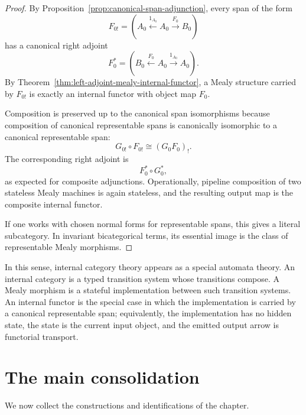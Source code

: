\begin{proof}
By Proposition~\ref{prop:canonical-span-adjunction}, every span of the form
\[
F_{0!}
=
\left(
A_0
\xleftarrow{1_{A_0}}
A_0
\xrightarrow{F_0}
B_0
\right)
\]
has a canonical right adjoint
\[
F_0^\ast
=
\left(
B_0
\xleftarrow{F_0}
A_0
\xrightarrow{1_{A_0}}
A_0
\right).
\]
By Theorem~\ref{thm:left-adjoint-mealy-internal-functor}, a Mealy structure carried by \(F_{0!}\) is exactly an internal functor with object map \(F_0\).

Composition is preserved up to the canonical span isomorphisms because composition of canonical representable spans is canonically isomorphic to a canonical representable span:
\[
G_{0!}\circ F_{0!}\cong (G_0F_0)_!.
\]
The corresponding right adjoint is
\[
F_0^\ast\circ G_0^\ast,
\]
as expected for composite adjunctions. Operationally, pipeline composition of two stateless Mealy machines is again stateless, and the resulting output map is the composite internal functor.

If one works with chosen normal forms for representable spans, this gives a literal subcategory. In invariant bicategorical terms, its essential image is the class of representable Mealy morphisms.
\end{proof}

\begin{remark}
\label{rem:automata-theoretic-internal-categories}
In this sense, internal category theory appears as a special automata theory. An internal category is a typed transition system whose transitions compose. A Mealy morphism is a stateful implementation between such transition systems. An internal functor is the special case in which the implementation is carried by a canonical representable span; equivalently, the implementation has no hidden state, the state is the current input object, and the emitted output arrow is functorial transport.
\end{remark}

\section{The main consolidation}
\label{sec:main-consolidation}

We now collect the constructions and identifications of the chapter.


